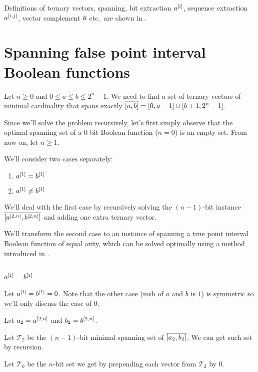 \documentclass{article}
\begin{document}

Definitions of
ternary vectors,
spanning,
bit extraction $a^{[i]}$,
sequence extraction $a^{[i, j]}$,
vector complement $\overline{a}$
etc.~are shown in \cite{Schieber2005154}.

\section{Spanning false point interval Boolean functions}
Let $n \geq 0$ and $0 \leq a \leq b \leq 2^n - 1$.
We need to find a set of ternary vectors of minimal cardinality
that spans exactly $\overline{[a, b]} = [0, a-1] \cup [b+1, 2^n - 1]$.

Since we'll solve the problem recursively,
let's first simply observe that the optimal spanning set of a $0$-bit Boolean function ($n = 0$)
is an empty set.
From now on, let $n \geq 1$.

We'll consider two cases separately:

\begin{enumerate}
\item $a^{[1]} = b^{[1]}$
\item $a^{[1]} \neq b^{[1]}$
\end{enumerate}

We'll deal with the first case
by recursively solving the $(n-1)$-bit instance $\overline{[a^{[2, n]}, b^{[2, n]}]}$
and adding one extra ternary vector.

We'll transform the second case
to an instance of spanning a true point interval Boolean function
of equal arity,
which can be solved optimally using a method introduced in \cite{Schieber2005154}.

\subsection{\texorpdfstring{$a^{[1]} = b^{[1]}$}{a[1] = b[1]}}
Let $a^{[1]} = b^{[1]} = 0$.
Note that the other case (\acrshort{msb} of $a$ and $b$ is $1$)
is symmetric so we'll only discuss the case of $0$.

Let $a_2 = a^{[2, n]}$ and $b_2 = b^{[2, n]}$.

Let $\mathcal{T}_2$ be the $(n-1)$-bit minimal spanning set of $\overline{[a_2, b_2]}$.
We can get such set by recursion.

Let $\mathcal{T}_0$ be the $n$-bit set we get by prepending each vector from $\mathcal{T}_2$ by $0$.
\end{document}
